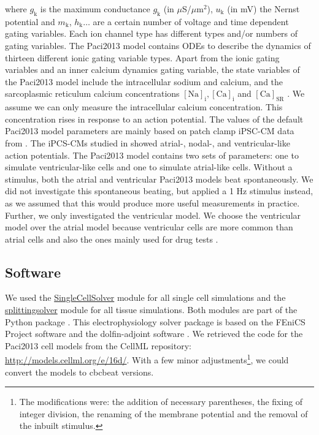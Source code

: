 \documentclass{article}
\begin{document}
where $g_{\mathrm{k}}$ is the maximum conductance $g_{\mathrm{k}}$ (in $\mu$S/$\mu$m$^2$), $u_{\mathrm{k}}$ (in mV) the Nernst potential and $m_{\mathrm{k}}$, $h_{\mathrm{k}} \ldots$ are a certain number of voltage and time dependent gating variables. Each ion channel type has different types and/or numbers of gating variables. The Paci2013 model contains ODEs to describe the dynamics of thirteen different ionic gating variable types. Apart from the ionic gating variables and an inner calcium dynamics gating variable, the state variables of the Paci2013 model include the intracellular sodium and calcium, and the sarcoplasmic reticulum calcium concentrations $[\mathrm{Na}]_\mathrm{i}, [\mathrm{Ca}]_{\mathrm{i}}$ and $[\mathrm{Ca}]_{\mathrm{SR}}$ \cite{Paci2013}. We assume we can only measure the intracellular calcium concentration. This concentration rises in response to an action potential. The values of the default Paci2013 model parameters are mainly based on patch clamp iPSC-CM data from \cite{Ma2011}. The iPCS-CMs studied in \cite{Ma2011} showed atrial-, nodal-, and ventricular-like action potentials. The Paci2013 model contains two sets of parameters: one to simulate ventricular-like cells and one to simulate atrial-like cells. Without a stimulus, both the atrial and ventricular Paci2013 models beat spontaneously. We did not investigate this spontaneous beating, but applied a 1 Hz stimulus instead, as we assumed that this would produce more useful measurements in practice. Further, we only investigated the ventricular model. We choose the ventricular model over the atrial model because ventricular cells are more common than atrial cells and also the ones mainly used for drug tests \cite{Paci2015}.
\subsection{Software} \label{Software}
We used the \url{SingleCellSolver} module for all single cell simulations and the \url{splittingsolver} module for all tissue simulations. Both modules are part of the Python package \cite{cbcbeat, cbcbeat2}. This electrophysiology solver package is based on the FEniCS Project software \cite{fenics, fenics2} and the dolfin-adjoint software \cite{dolfin-adjoint, dolfin-adjoint2}. We retrieved the code for the Paci2013 cell models from the CellML repository: \url{http://models.cellml.org/e/16d/}. With a few minor adjustments\footnote{The modifications were: the addition of necessary parentheses, the fixing of integer division, the renaming of the membrane potential and the removal of the inbuilt stimulus.}, we could convert the models to cbcbeat versions. 
\end{document}
